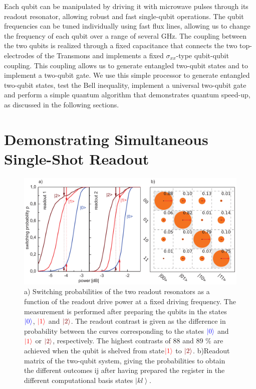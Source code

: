 Each qubit can be manipulated by driving it with microwave pulses
through its readout resonator, allowing robust and fast single-qubit
operations. The qubit frequencies can be tuned individually using
fast flux lines, allowing us to change the frequency of each qubit
over a range of several GHz. The coupling between the two qubits is
realized through a fixed capacitance that connects the two top-electrodes
of the Transmons and implements a fixed $\sigma_{xx}$-type qubit-qubit
coupling. This coupling allows us to generate entangled two-qubit
states and to implement a two-qubit gate. We use this simple processor
to generate entangled two-qubit states, test the Bell inequality,
implement a universal two-qubit gate and perform a simple quantum
algorithm that demonstrates quantum speed-up, as discussed
in the following sections.


\section{Demonstrating Simultaneous Single-Shot Readout}

%
\begin{figure}[ht!]
 \centering
\includegraphics[width=\textwidth]{"./data/ct5/2011_04_21 - grover and tomo/good_data/s curves and readout"}
\caption[Switching probabilities of the two qubit readouts as a function of
the readout excitation power]{a) Switching probabilities of the two readout resonators
as a function of the readout drive power at a fixed driving frequency.
The measurement is performed after preparing the qubits in the states
${\color{blue}{\left| 0 \right>}}$, ${\color{red}{\left| 1 \right>}}$ and ${\color{brown}{\ket{2}}}$.
The readout contrast is given as the difference in probability between
the curves corresponding to the states ${\color{blue}{\left| 0 \right>}}$
and ${\color{red}{\left| 1 \right>}}$ or ${\color{brown}{\ket{2}}}$, respectively.
The highest contrasts of 88 and 89 \% are achieved when the qubit
is shelved from state${\color{red}{\left| 1 \right>}}$ to ${\color{brown}{\ket{2}}}$.
b)Readout matrix of the two-qubit system, giving
the probabilities to obtain the different outcomes ij after having
prepared the register in the different computational basis states
$\left|kl\right\rangle $.}


\label{fig:qubit_readout_characteristics} %
\end{figure}


